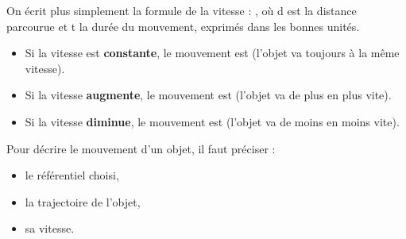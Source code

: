 \documentclass[11pt,a4paper]{article}
\begin{document}
On écrit plus simplement la formule de la vitesse : , où d est la distance parcourue et t la durée du mouvement, exprimés dans les bonnes unités.

\begin{itemize}
    \item Si la vitesse est \textbf{constante}, le mouvement est  (l’objet va toujours à la même vitesse).
    \item Si la vitesse \textbf{augmente}, le mouvement est  (l’objet va de plus en plus vite).
    \item Si la vitesse \textbf{diminue}, le mouvement est  (l’objet va de moins en moins vite).
\end{itemize}


Pour décrire le mouvement d’un objet, il faut préciser :

\begin{itemize}
    \item le référentiel choisi,
    \item la trajectoire de l’objet,
    \item sa vitesse.
\end{itemize}
\end{document}
